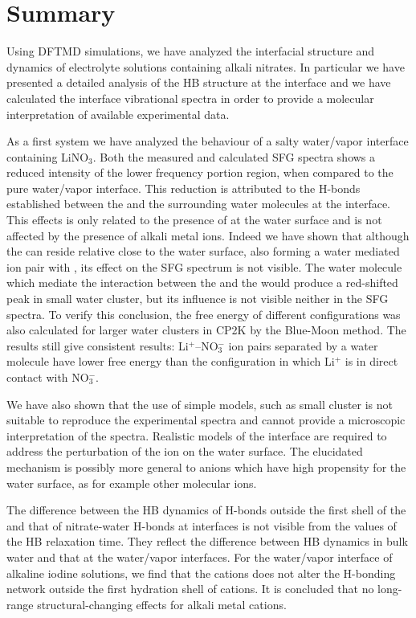 \chapter{Summary}\label{CHAPTER_Summary}
Using DFTMD simulations, we have analyzed the interfacial structure and dynamics of electrolyte solutions containing alkali nitrates.
In particular we have presented a detailed analysis of the HB structure at the interface and we have calculated the interface vibrational spectra
in order to provide a molecular interpretation of available experimental data. 

As a first system we have analyzed the behaviour of a salty water/vapor interface containing LiNO$_3$.
Both the measured and calculated SFG spectra shows a reduced intensity of the lower frequency portion region, 
when compared to the pure water/vapor interface. 
This reduction is attributed to the H-bonds established between the \nitrate and the surrounding water molecules at the interface.
This effects is only related to the presence of \nitrate at the water surface and is not affected by the presence of alkali metal ions.
Indeed we have shown that although the \Li can reside relative close to the water surface, also forming a water mediated
ion pair with \nit, its effect on the SFG spectrum is not visible. The water molecule which mediate the interaction 
between the \nitrate and the \Li would produce a red-shifted peak in small water cluster, but its influence is not visible 
neither in the SFG spectra. To verify this conclusion, the free energy of different configurations was also calculated for 
larger water clusters in CP2K by the Blue-Moon method. The results still give consistent results: Li$^+$--NO$_3^-$ ion pairs 
separated by a water molecule have lower free energy than the configuration in which Li$^+$ is in direct contact with NO$_3^-$. 

We have also shown that the use of simple models, such as small cluster is not suitable to reproduce the experimental spectra 
and cannot provide a microscopic interpretation of the spectra. Realistic models of the interface are required to address the 
perturbation of the ion on the water surface. The elucidated mechanism is possibly more general to anions which have high 
propensity for the water surface, as for example other molecular ions.

The difference between the HB dynamics of H-bonds outside the first shell of the \Li and that of nitrate-water H-bonds 
at interfaces is not visible from the values of the HB relaxation time. They reflect the difference between HB dynamics in 
bulk water and that at the water/vapor interfaces. For the water/vapor interface of alkaline iodine solutions, we find 
that the cations does not alter the H-bonding network outside the first hydration shell of cations. 
It is concluded that no long-range structural-changing effects for alkali metal cations.


